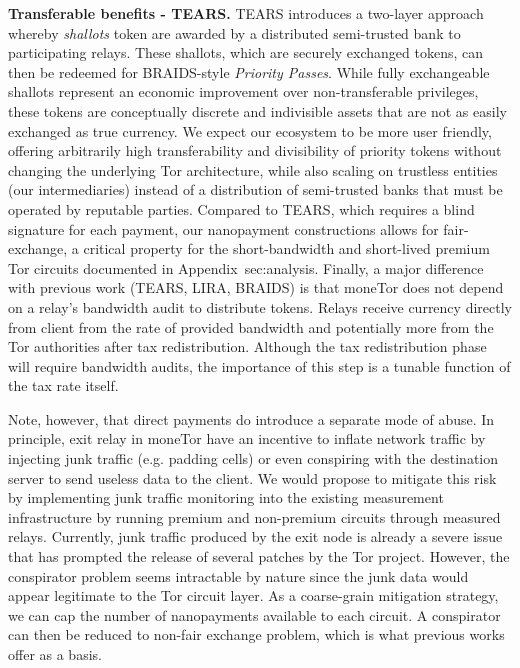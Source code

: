 
\medskip\noindent\textbf{Transferable benefits - TEARS.} TEARS introduces a
two-layer approach whereby \emph{shallots} token are awarded by a distributed
semi-trusted bank to participating relays. These shallots, which are securely
exchanged tokens, can then be redeemed for BRAIDS-style \emph{Priority Passes}.
While fully exchangeable shallots represent an economic improvement over
non-transferable privileges, these tokens are conceptually discrete and
indivisible assets that are not as easily exchanged as true currency. We expect
our ecosystem to be more user friendly, offering arbitrarily high
transferability and divisibility of priority tokens without changing the
underlying Tor architecture, while also scaling on trustless entities (our
intermediaries) instead of a distribution of semi-trusted banks that must be
operated by reputable parties. Compared to TEARS, which requires a blind
signature for each payment, our nanopayment constructions allows for
fair-exchange, a critical property for the short-bandwidth and short-lived
premium Tor circuits documented in Appendix~{sec:analysis}. Finally, a major
difference with previous work (TEARS, LIRA, BRAIDS) is that moneTor does not
depend on a relay's bandwidth audit to distribute tokens. Relays receive
currency directly from client from the rate of provided bandwidth and
potentially more from the Tor authorities after tax redistribution. Although the
tax redistribution phase will require bandwidth audits, the importance of this
step is a tunable function of the tax rate itself.

Note, however, that direct
payments do introduce a separate mode of abuse. In principle, exit relay in
moneTor have an incentive to inflate network traffic by injecting junk traffic
(e.g. padding cells) or even conspiring with the destination server to send
useless data to the client. We would propose to mitigate this risk by
implementing junk traffic monitoring into the existing measurement
infrastructure by running premium and non-premium circuits through measured
relays. Currently, junk traffic produced by the exit node is already a severe
issue~\cite{rochet2018dropping} that has prompted the release of several patches
by the Tor project. However, the conspirator problem seems intractable
by nature since the junk data would appear legitimate to the Tor circuit layer.
As a coarse-grain mitigation strategy, we can cap the number of nanopayments
available to each circuit. A conspirator can then be reduced to non-fair
exchange problem, which is what previous works offer as a basis.

